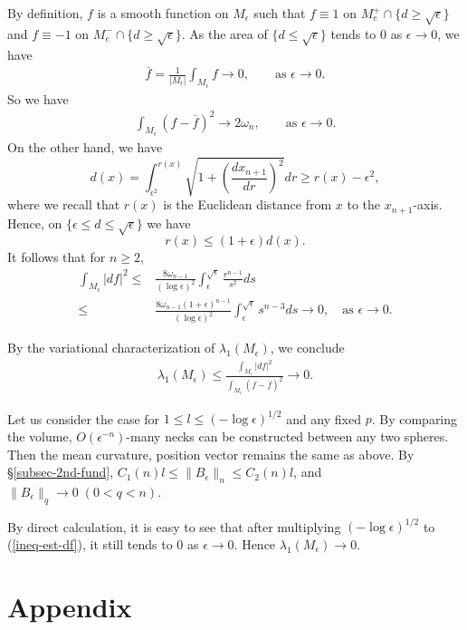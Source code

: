 \documentclass{amsart}
\numberwithin{equation}{section}
\theoremstyle{remark}
\renewcommand{\(}{\left(}
\renewcommand{\)}{\right)}
\renewcommand{\~}{\tilde}
\renewcommand{\-}{\overline}
\newcommand{\e}{\epsilon}
\renewcommand{\l}{\lambda}
\newcommand{\ra}{\rightarrow}
\begin{document}
By definition, $f$ is a smooth function on $M_\e$ such that $f\equiv 1$ on $ M_e^{+} \cap \{d\geq \sqrt{\e}\}$ and $f\equiv -1$ on $M_e^{-} \cap \{d\geq \sqrt{\e}\}$. As the area of $\{d\leq \sqrt{\e}\}$ tends to $0$ as $\e \to 0$, we have
\begin{align*}
\overline{f}=\frac{1}{|M_\e|}\int_{M_\e} f \to 0, \qquad \text{as $\e \to 0$}.
\end{align*}
So we have
\begin{align*}
\int_{M_\e}(f-\overline{f})^2 \to 2\omega_n, \qquad \text{as $\e \to 0$}.
\end{align*}
On the other hand, we have
$$
d(x)=\int_{\e^2}^{r(x)} \sqrt{1+\(\frac{dx_{n+1}}{dr}\)^2}dr  \geq  r(x)-\e^2,
$$
where we recall that $r(x)$ is the Euclidean distance from $x$ to the $x_{n+1}$-axis. Hence, on $\{\e\leq d \leq \sqrt{\e} \}$ we have
$$
r(x) \leq (1+\e)d(x).
$$
It follows that for $n\geq 2$,
\begin{equation}\label{ineq-est-df}
\begin{aligned}
\int_{M_\e}|df|^2 \leq &\frac{8 \omega_{n-1}}{(\log \e)^2}\int_{\e}^{\sqrt{\e}} \frac{r^{n-1}}{s^2}ds 
\\
\leq &\frac{8\omega_{n-1} (1+\e)^{n-1}}{(\log \e)^2}\int_{\e}^{\sqrt{\e}} s^{n-3}ds \to 0, \quad \text{as $\e \ra 0$}.
\end{aligned}
\end{equation}

By the variational characterization of $\l_1(M_\e)$, we conclude
\begin{align*}
\l_1(M_\e)\le \frac{\int_{M_\e}|df|^2}{\int_{M_\e}(f-\overline{f})^2}\to 0.
\end{align*}

Let us consider the case for $1\le l\le (-\log \epsilon)^{1/2}$ and any fixed $p$. By comparing the volume, $O(\epsilon^{-n})$-many necks can be constructed between any two spheres. Then the mean curvature, position vector remains the same as above. By \S \ref{subsec-2nd-fund}, $C_1(n)l\le \|B_\epsilon\|_n\le C_2(n)l$, and 	$\|B_\e\|_q \to 0 \; (0< q<n)$.


By direct calculation, it is easy to see that after multiplying $(-\log \epsilon)^{1/2}$ to (\ref{ineq-est-df}), it still tends to $0$ as $\epsilon\to 0$. Hence $\lambda_1(M_\e)\to 0$.

\section{Appendix}
\end{document}
